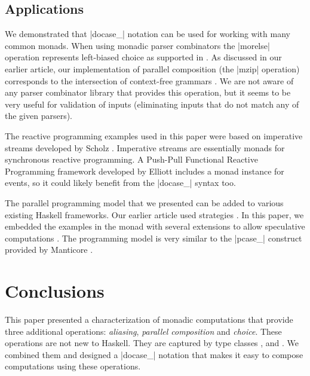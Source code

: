 \documentclass{sigplanconf}
\begin{document}

\subsection{Applications}
We demonstrated that |docase_| notation can be used for working with many common 
monads. When using monadic parser combinators \cite{monadparsing} the |morelse| operation
represents left-biased choice as supported in \cite{parsec}. As discussed in our earlier article,
our implementation of parallel composition (the |mzip| operation) corresponds to the intersection
of context-free grammars \cite{parcomprefun}. We are not aware of any parser combinator library that
provides this operation, but it seems to be very useful for validation of inputs (eliminating inputs
that do not match any of the given parsers).

The reactive programming examples used in this paper were based on imperative streams developed by 
Scholz \cite{imperative-streams}. Imperative streams are essentially monads for synchronous 
reactive programming. A Push-Pull Functional Reactive Programming framework developed by Elliott 
\cite{push-pull-frp} includes a monad instance for events, so it could likely benefit from the
|docase_| syntax too.

The parallel programming model that we presented can be added to various existing Haskell frameworks.
Our earlier article \cite{parcomprefun} used strategies \cite{strategies-new}. In this paper,
we embedded the examples in the  monad \cite{parmonad} with several extensions to
allow speculative computations \cite{parmonad-cancellation}. The programming model is very
similar to the |pcase_| construct provided by Manticore \cite{manticore}.


\section{Conclusions}
This paper presented a characterization of monadic computations that provide three additional 
operations: \textit{aliasing}, \textit{parallel composition} and \textit{choice}. 
These operations are not new to Haskell. They are captured by type classes , 
 and . We combined them and designed a |docase_| notation that makes 
it easy to compose computations using these operations.
\end{document}
